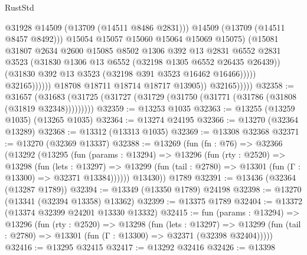 \begin{lexlean}{RustStd}
\begin{coremodule}
                                        @31928
                                        @14509
                                        (@13709 (@14511 @8486 @2831)))
                                      @14509
                                      (@13709 (@14511 @8457 @8492)))
                                    @15054
                                    @15057
                                    @15060
                                    @15064
                                    @15069
                                    @15075)
                                  (@15081
                                    @31807
                                    @2634
                                    @2600
                                    @15085
                                    @8502
                                    @1306
                                    @392
                                    @13
                                    @2831
                                    @6552
                                    @2831
                                    @3523
                                    (@31830 @1306 @13 @6552 (@32198 @1305 @6552 @26435 @26439))
                                    (@31830 @392 @13 @3523 (@32198 @391 @3523 @16462 @16466)))))
                              @32165))))))
                  @18708
                  @18711
                  @18714
                  @18717
                  @13905))
              @32165)))))
@32358 := @31657
    (@31683 (@31725 (@31727 (@31729 (@31750 (@31771 (@31786 (@31808 (@31819 @32348)))))))))
@32359 := @13253 @1035
@32363 := @13255 (@13259 @1035) (@13265 @1035)
@32364 := @13274 @24195
@32366 := @13270 (@32364 @13289)
@32368 := @13312 (@13313 @1035)
@32369 := @13308 @32368
@32371 := @13270 (@32369 @13337)
@32388 := @13269
    (fun (fn : @76) =>
    @32366
      (@13292
        (@13295
          (fun (params : @13294) =>
          @13296
            (fun (rty : @2520) =>
            @13298
              (fun (lets : @13297) =>
              @13299 (fun (tail : @2780) => @13301 (fun (Γ : @13300) => @32371 @13384))))))
        @13430))
    @1789
@32391 := @13436 (@32364 (@13287 @1789))
@32394 := @13349 (@13350 @1789) @24198
@32398 := @13270 (@13341 (@32394 @13358) @13362)
@32399 := @13375 @1789
@32404 := @13372 (@13374 @32399 @24201 @13330 @13332)
@32415 := fun (params : @13294) =>
  @13296
    (fun (rty : @2520) =>
    @13298
      (fun (lets : @13297) =>
      @13299 (fun (tail : @2780) => @13301 (fun (Γ : @13300) => @32371 (@32398 @32404)))))
@32416 := @13295 @32415
@32417 := @13292 @32416
@32426 := @13398

\end{coremodule}
\end{lexlean}
